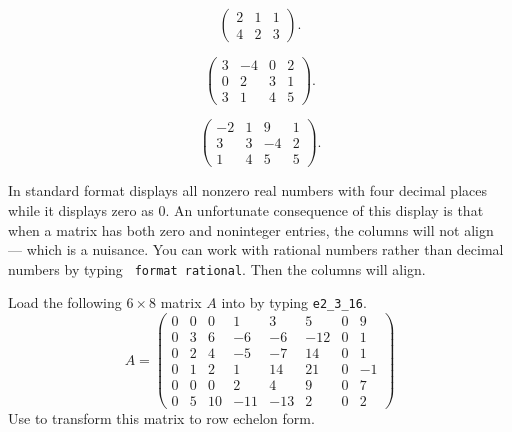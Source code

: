 \documentclass{ximera}
\begin{document}
\begin{exercise} \label{c2.3.1a}
\[
\left(\begin{array}{rrr}
 2 &  1  &  1   \\
 4 &  2  &  3
\end{array}\right).
\]
\end{exercise}
\begin{exercise} \label{c2.3.1b}
\[
\left(\begin{array}{rrrr}
 3  & -4 & 0 & 2\\
 0  &  2 & 3 & 1\\
 3  &  1 & 4 & 5
\end{array}\right).
\]
\end{exercise}
\begin{exercise} \label{c2.3.1c}
\[
\left(\begin{array}{rrrr}
 -2 & 1 &  9 & 1\\
  3 & 3 & -4 & 2\\
  1 & 4 &  5 & 5
\end{array}\right).
\]
\end{exercise}

 {\rm In standard format \Matlab displays
all nonzero real numbers with four decimal places while it displays
zero as $0$.  An unfortunate consequence of this display is that
when a matrix has both zero and noninteger entries, the columns
will not align --- which is a nuisance.  You can work with
rational numbers rather than decimal numbers by typing {\tt
format rational}.  Then the columns will align.}

\begin{exercise} \label{c2.3.2}
Load the following $6\times 8$ matrix $A$ into \Matlab by typing
{\tt e2\_3\_16}.
\begin{equation*}
A=\left(\begin{array}{rrrrrrrr}
0 & 0 &  0 &   1 &   3 &   5 & 0 &  9 \\
0 & 3 &  6 &  -6 &  -6 & -12 & 0 &  1 \\
0 & 2 &  4 &  -5 &  -7 &  14 & 0 &  1 \\
0 & 1 &  2 &   1 &  14 &  21 & 0 & -1 \\
0 & 0 &  0 &   2 &   4 &   9 & 0 &  7 \\
0 & 5 & 10 & -11 & -13 &   2 & 0 &  2
\end{array}\right)
\end{equation*}
Use \Matlab to transform this matrix to row echelon form.
\end{exercise}
\end{document}
